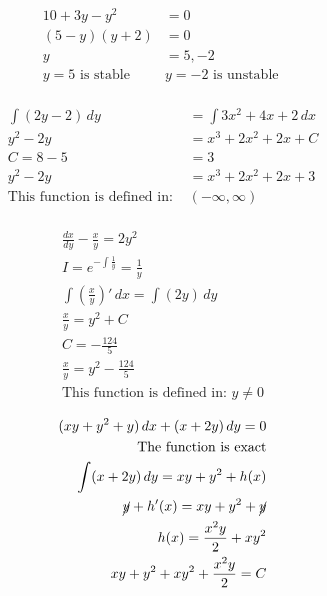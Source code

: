 \documentclass[12pt]{article}
\begin{document}
\hline
\begin{equation}
  \begin{split}
    10+3y-y^2 & = 0 \\
    (5-y)(y+2) & = 0 \\
    y & = 5, -2 \\
    y = 5 \text{ is stable } & y = -2 \text{ is unstable } \\
  \end{split}
  \label{4}
\end{equation}

\hline
\begin{equation}
  \begin{split}
    \int(2y-2)\,dy & = \int 3x^2+4x+2\,dx \\
    y^2-2y & = x^3+2x^2+2x+C \\
    C = 8-5 & = 3 \\
    y^2-2y & = x^3+2x^2+2x+3 \\
  \text{This function is defined in: } & (-\infty,\infty)\\
  \end{split}
  \label{5}
\end{equation}
\hline

\begin{equation}
  \begin{split}
    \frac{dx}{dy}-\frac{x}{y}=2y^2 \\
    I = e^{-\int\frac{1}{y}}=\frac{1}{y}\\
    \int\left( \frac{x}{y} \right)'\,dx=\int\left( 2y \right)\,dy\\
    \frac{x}{y}=y^2+C\\
    C=-\frac{124}{5} \\
    \frac{x}{y}=y^2-\frac{124}{5} \\
    \text{This function is defined in: } y\neq0 
  \end{split}
  \label{6}
\end{equation}
\hline


\hline
\begin{equation}
  \begin{split}
    (xy+y^2+y)\,dx+(x+2y)\,dy=0\\
    \text{The function is exact}\\
    \int(x+2y)\,dy=xy+y^2+h(x)\\
    \cancel{y}+h'(x)=xy+y^2+\cancel{y}\\
    h(x)=\frac{x^2y}{2}+xy^2\\
    xy+y^2+xy^2+\frac{x^2y}{2}=C\\
  \end{split}
  \label{7}
\end{equation}
\hline
\end{document}

